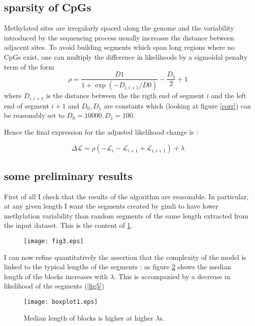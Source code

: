 \documentclass[12pt]{amsart}
\newcommand{\lik}{\ensuremath{\mathcal{L}}}
\begin{document}
\subsection{sparsity of CpGs}

Methylated sites are irregularly spaced along the genome and the variability 
introduced by the sequencing process usually increases the distance 
between adjacent sites.
To avoid building segments which span long regions where no CpGs exist, one 
can multiply the difference in likelihoods by a sigmoidal penalty term of the
form \[\rho=\frac{D1}{1+\exp(-D_{i,i+1}/D0)}-\frac{D_1}{2}+1\] where $D_{i,i+1}$ is the distance 
between the the rigth end of segment $i$ and the left end of segment $i+1$ and 
$D_0,D_1$ are constants which (looking at figure \ref{corr}) can be reasonably 
set to $D_0=10000,D_1=100$. 

Hence the final expression for the adjusted likelihood change is :

\begin{equation}
\Delta \lik = \rho ( -\mathcal{L}_i-\mathcal{L}_{i+1}+\mathcal{L}_{i,i+1} )  +\lambda
\end{equation}


\subsection{some preliminary results}

First of all I check that the results of the algorithm are reasonable.
In particular, at any given length I want the segments created by gimli to have lower methylation
variability than random segments of the same length extracted from the input dataset. This is the content of
\ref{fig3}.

\begin{figure}\label{fig3}
\texttt{[image: fig3.eps]}
\caption{}
\end{figure}

I can now refine quantitatively the assertion that the complexity of the model
is linked to the typical lengths of the segments : as figure \ref{fig4} 
shows the median length of the blocks increases with $\lambda$. This is 
accompanied by a decrease in likelihood of the segments (\ref{fig5})

\begin{figure}\label{fig4}
\texttt{[image: boxplot1.eps]}
\caption{Median length of blocks is higher at higher $\lambda$s.}
\end{figure}
\end{document}
